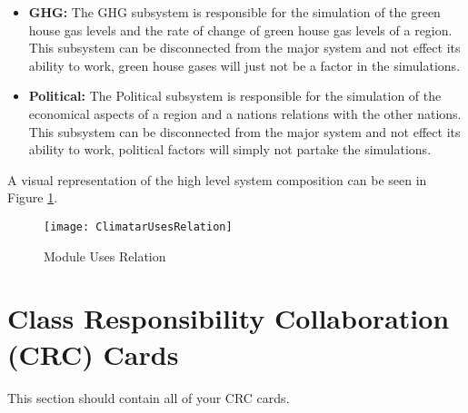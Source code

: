 \documentclass[]{article}
\begin{document}
\begin{itemize}
	\item \textbf{GHG:} The GHG subsystem is responsible for the simulation of the green house gas levels and the rate of change of green house gas levels of a region. This subsystem can be disconnected from the major system and not effect its ability to work, green house gases will just not be a factor in the simulations.
	
	\item \textbf{Political:} The Political subsystem is responsible for the simulation of the economical aspects of a region and a nations relations with the other nations. This subsystem can be disconnected from the major system and not effect its ability to work, political factors will simply not partake the simulations.
	
\end{itemize}
A visual representation of the high level system composition can be seen in Figure \ref{usesrelation}.
\begin{figure}[ht!]
\centering
\texttt{[image: ClimatarUsesRelation]}
\caption{Module Uses Relation \label{usesrelation}}
\end{figure}

	
\section{Class Responsibility Collaboration (CRC) Cards}
\label{sec:class_responsibility_collaboration_crc_cards}
This section should contain all of your CRC cards.
\end{document}
